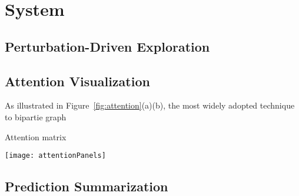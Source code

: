 \section{System}



\subsection{Perturbation-Driven Exploration}
\label{sec:perturb}


\subsection{Attention Visualization}
As illustrated in Figure~\ref{fig:attention}(a)(b), the most widely adopted technique to bipartie graph

Attention matrix


\begin{figure*}[t]
\centering
\vspace{-2mm}
 \texttt{[image: attentionPanels]}
  \vspace{-6mm}
 \caption{
Attention visualization. In the graph attention view (a), a bipartite graph encoding is adopted, in which the edge thickness corresponds to the attention value. In the matrix attention view (b), the entries of $i^{th}$ row represent the probabilities of words in hypotheses align to the $i^{th}$ word in the premise.
The user can alter the attention values via the pop-up interface illustrated in (c).
We overlay the dependency tree ($a_1$) grammar structure to highlight important words and allow simplification of complex sentence based on the dependency tree.
%
For highly asymmetric attention relationship, we utilized a zoomable hierarchical visual representation (d).
}
\label{fig:attention}
\end{figure*}


\subsection{Prediction Summarization}


